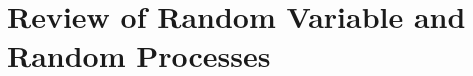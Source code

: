 \documentclass[../course]{subfiles}
\begin{document}
\chapter{Review of Random Variable and Random Processes}


\end{document}
